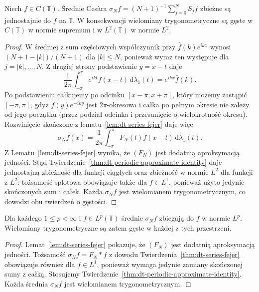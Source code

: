 \begin{twierdzenie}
\label{thm:dt-series-fejer}
Niech $f\in C(\mathbb T)$. Średnie Cesàra
$\sigma_N f=(N+1)^{-1}\sum_{j=0}^N S_jf$
zbieżne są jednostajnie do $f$ na $\mathbb T$.
W konsekwencji wielomiany trygonometryczne są gęste
w $C(\mathbb T)$ w normie supremum i w $L^2(\mathbb T)$
w normie $L^2$.
\end{twierdzenie}
\begin{proof}
W średniej z sum częściowych współczynnik
przy $\widehat f(k)e^{ikx}$ wynosi
$(N+1-|k|)/(N+1)$ dla $|k|\leq N$, ponieważ
wyraz ten występuje dla $j=|k|,\ldots,N$.
Z drugiej strony podstawienie $y=x-t$ daje
\[
 \frac1{2\pi}\int_{-\pi}^{\pi}e^{ikt}f(x-t)\,
 \mathrm d\lambda_1(t)=e^{ikx}\widehat f(k).
\]
Po podstawieniu całkujemy po odcinku
$[x-\pi,x+\pi]$, który możemy zastąpić
$[-\pi,\pi]$, gdyż $f(y)e^{-iky}$ jest
$2\pi$-okresowa i całka po pełnym okresie
nie zależy od jego początku (przez podział
odcinka i przesunięcie o wielokrotność okresu).
Rozwinięcie skończone z lematu~\ref{lem:dt-series-fejer}
daje więc
\[
 \sigma_Nf(x)=\frac1{2\pi}\int_{-\pi}^{\pi}
 F_N(t)f(x-t)\,\mathrm d\lambda_1(t).
\]
Z Lematu~\ref{lem:dt-series-fejer} wynika, że
$(F_N)$ jest dodatnią aproksymacją jedności.
Stąd Twierdzenie~\ref{thm:dt-periodic-approximate-identity}
daje jednostajną zbieżność dla funkcji ciągłych
oraz zbieżność w normie $L^2$ dla funkcji z $L^2$:
tożsamość splotowa obowiązuje także dla $f\in L^1$,
ponieważ użyto jedynie skończonych sum i całek.
Każda $\sigma_Nf$ jest wielomianem trygonometrycznym,
co dowodzi obu twierdzeń o gęstości.
\end{proof}

\begin{wniosek}
\label{cor:dt-fejer-lp}
Dla każdego $1\le p<\infty$ i $f\in L^p(\mathbb T)$
średnie $\sigma_Nf$ zbiegają do $f$ w normie $L^p$.
Wielomiany trygonometryczne są zatem gęste
w każdej z tych przestrzeni.
\end{wniosek}
\begin{proof}
Lemat~\ref{lem:dt-series-fejer} pokazuje, że
$(F_N)$ jest dodatnią aproksymacją jedności.
Tożsamość $\sigma_N f=F_N*f$ z dowodu
Twierdzenia~\ref{thm:dt-series-fejer} obowiązuje
również dla $f\in L^1$, ponieważ wymaga jedynie
zamiany skończonej sumy z całką.
Stosujemy Twierdzenie~\ref{thm:dt-periodic-approximate-identity}.
Każda średnia $\sigma_Nf$ jest wielomianem trygonometrycznym.
\end{proof}

